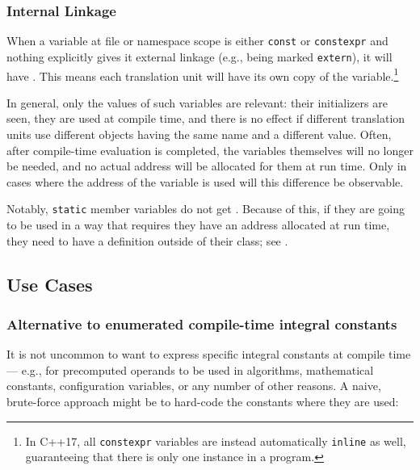 \subsubsection[Internal Linkage]{Internal Linkage}

When a variable at file or namespace scope is either \lstinline!const! or \lstinline!constexpr! and nothing explicitly gives it external linkage (e.g., being marked \lstinline!extern!), it
will have .  This means each translation unit will have its own copy of the
variable.{\cprotect\footnote{In C++17, all \lstinline!constexpr! variables are instead automatically \lstinline!inline! as well,
guaranteeing that there is only one instance in a program.}}

In general, only the values of such variables are relevant: their initializers are seen, they are used at compile time, and there is no effect if different translation units use different objects having the same
name and a different value.  Often, after compile-time evaluation is completed, the variables themselves will no longer be
needed, and no actual address will be allocated for them at run time.   Only in cases where the address of
the variable is used will this difference be observable.

Notably, \lstinline!static! member variables do not get .  Because of this, if they
are going to be used in a way that requires they have an address allocated at run time, they need to have a
definition outside of their class; see .

\subsection[Use Cases]{Use Cases}\label{use-cases}

\subsubsection[Alternative to enumerated compile-time integral constants]{Alternative to enumerated compile-time integral constants}\label{alternative-to-enumerated-compile-time-integral-constants}

It is not uncommon to want to express specific integral constants at
compile time --- e.g., for precomputed operands to be used in
algorithms, mathematical constants, configuration variables, or any
number of other reasons. A naive, brute-force approach might be to
hard-code the constants where they are used:

